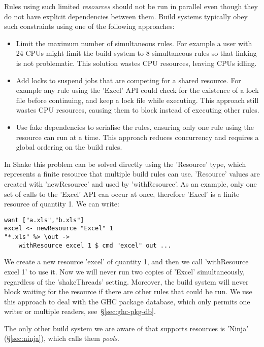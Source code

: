 \noindent Rules using such limited \emph{resources} should not be run in
parallel even though they do not have explicit dependencies between them. Build systems
typically obey such constraints using one of the following approaches:

\begin{itemize}
\item Limit the maximum number of simultaneous rules. For example a user with
24 CPUs might limit the build system to 8 simultaneous rules so that linking is
not problematic. This solution wastes CPU resources, leaving CPUs idling.
\item Add locks to suspend jobs that are competing for a shared resource. For
example any rule using the \lst'Excel' API could check for the existence of a lock
file before continuing, and keep a lock file while executing. This approach
still wastes CPU resources, causing them to block instead of executing other
rules.
\item Use fake dependencies to serialise the rules, ensuring
only one rule using the resource can run at a time. This approach reduces
concurrency and requires a global ordering on the build rules.
\end{itemize}

In Shake this problem can be solved directly using the \lst'Resource' type,
which represents a finite resource that multiple build rules can use. \lst'Resource'
values are created with \lst'newResource' and used by \lst'withResource'. As an
example, only one set of calls to the \lst'Excel' API can occur at once, therefore
\lst'Excel' is a finite resource of quantity 1. We can write:

\begin{lstlisting}
want ["a.xls","b.xls"]
excel <- newResource "Excel" 1
"*.xls" %> \out ->
    withResource excel 1 $ cmd "excel" out ...
\end{lstlisting}

\noindent We create a new resource \lst'excel' of quantity 1, and then we call
\lst'withResource excel 1' to use it. Now we will never run two copies of
\lst'Excel' simultaneously, regardless of the \lst'shakeThreads' setting.
Moreover, the build system will never block waiting for the resource if there
are other rules that could be run. We use this approach to deal with the GHC
package database, which only permits one writer or multiple readers,
see~\S\ref{sec:ghc-pkg-db}.

The only other build system we are aware of that supports resources is
\lst'Ninja' (\S\ref{sec:ninja}), which calls them \emph{pools}.

